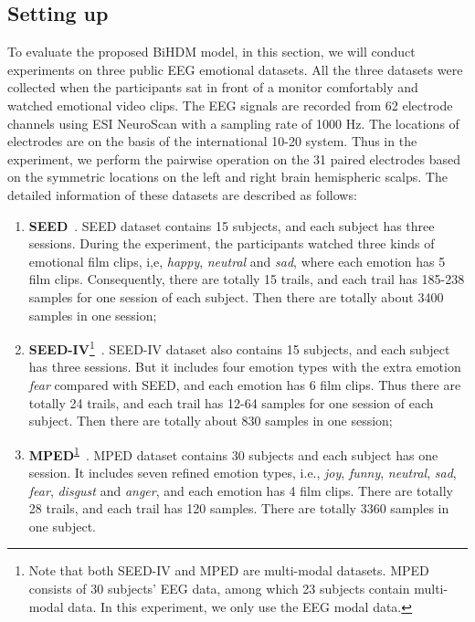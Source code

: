 \documentclass[journal]{IEEEtran}
\begin{document}
\subsection{Setting up}
To evaluate the proposed BiHDM model, in this section, we will conduct experiments on three public EEG emotional datasets. All the three datasets were collected when the participants sat in front of a monitor comfortably and watched emotional video clips. The EEG signals are recorded from 62 electrode channels using ESI NeuroScan with a sampling rate of 1000 Hz. The locations of electrodes are on the basis of the international 10-20 system. Thus in the experiment, we perform the pairwise operation on the 31 paired electrodes based on the symmetric locations on the left and right brain hemispheric scalps. The detailed information of these datasets are described as follows:
\begin{enumerate}
	\item[(1)] \textbf{SEED}~\cite{zheng2015investigating}. SEED dataset contains 15 subjects, and each subject has three sessions. During the experiment, the participants watched three kinds of emotional film clips, i,e, \textit{happy}, \textit{neutral} and \textit{sad}, where each emotion has 5 film clips. Consequently, there are totally 15 trails, and each trail has 185-238 samples for one session of each subject. Then there are totally about 3400 samples in one session;
	
	\item[(2)] \textbf{SEED-IV}\footnote{Note that both SEED-IV and MPED are multi-modal datasets. MPED consists of 30 subjects' EEG data, among which 23 subjects contain multi-modal data. In this experiment, we only use the EEG modal data.\label{Footnote: SEED-IV}}~\cite{zheng2018emotionmeter}. SEED-IV dataset also contains 15 subjects, and each subject has three sessions. But it includes four emotion types with the extra emotion \textit{fear} compared with SEED, and each emotion has 6 film clips. Thus there are totally 24 trails, and each trail has 12-64 samples for one session of each subject. Then there are totally about 830 samples in one session;
	
	\item[(3)] \textbf{MPED}\textsuperscript{\ref {Footnote: SEED-IV}}~\cite{8606087}. MPED dataset contains 30 subjects and each subject has one session. It includes seven refined emotion types, i.e., \textit{joy}, \textit{funny}, \textit{neutral}, \textit{sad}, \textit{fear}, \textit{disgust} and \textit{anger}, and each emotion has 4 film clips. There are totally 28 trails, and each trail has 120 samples. There are totally 3360 samples in one subject.
\end{enumerate}
\end{document}
